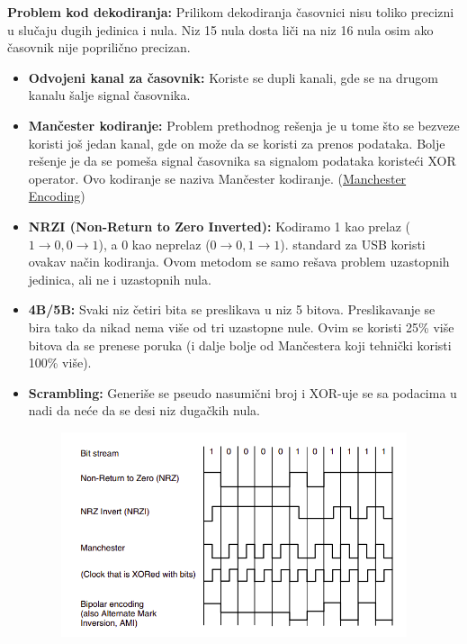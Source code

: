 \documentclass[a4paper]{article}
\begin{document}
        
        \textbf{Problem kod dekodiranja: } Prilikom dekodiranja časovnici nisu toliko precizni u slučaju 
        dugih jedinica i nula. Niz 15 nula dosta liči na niz 16 nula osim ako časovnik 
        nije poprilično precizan.
        \begin{itemize}
            \item \textbf{Odvojeni kanal za časovnik:} Koriste se dupli kanali, gde se na drugom 
                  kanalu šalje signal časovnika.  
            \item \textbf{Mančester kodiranje:} Problem prethodnog rešenja je u tome što se 
                  bezveze koristi još jedan kanal,
                  gde on može da se koristi za prenos podataka. Bolje rešenje je da se pomeša 
                  signal časovnika sa signalom podataka koristeći XOR operator. Ovo kodiranje 
                  se naziva Mančester kodiranje.
                  (\href{https://www.youtube.com/watch?v=XKtxxZ327UM}{Manchester Encoding})
            \item \textbf{NRZI (Non-Return to Zero Inverted):} Kodiramo 1 kao prelaz 
                  ($1 \rightarrow 0, 0 \rightarrow 1$), 
                  a 0 kao neprelaz ($0 \rightarrow 0, 1 \rightarrow 1$). 
                  standard za USB koristi ovakav način kodiranja. Ovom metodom se samo rešava problem uzastopnih
                  jedinica, ali ne i uzastopnih nula.
            \item \textbf{4B/5B: } Svaki niz četiri bita se preslikava u niz 5 bitova. Preslikavanje
                  se bira tako da nikad nema više od tri uzastopne nule. Ovim se koristi 25\% više
                  bitova da se prenese poruka (i dalje bolje od Mančestera koji tehnički koristi 100\%
                  više). 
            \item \textbf{Scrambling: } Generiše se pseudo nasumični broj i XOR-uje se sa podacima u
                  nadi da neće da se desi niz dugačkih nula. 
        \end{itemize}
        \begin{figure}[H]
            \begin{center}
                \includegraphics[width=120mm,height=60mm]{Slike/kodiranje1.png}
            \end{center}
        \end{figure}
\end{document}
